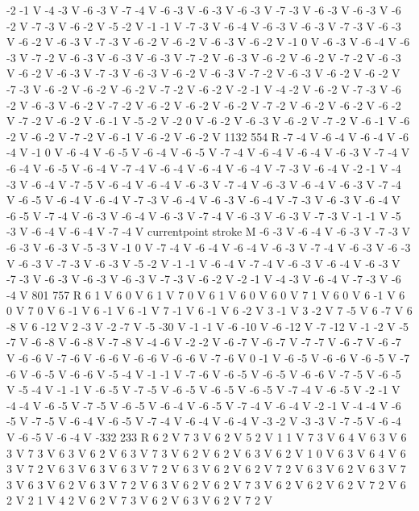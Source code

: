 {-2 -1 V
-4 -3 V
-6 -3 V
-7 -4 V
-6 -3 V
-6 -3 V
-6 -3 V
-7 -3 V
-6 -3 V
-6 -3 V
-6 -2 V
-7 -3 V
-6 -2 V
-5 -2 V
-1 -1 V
-7 -3 V
-6 -4 V
-6 -3 V
-6 -3 V
-7 -3 V
-6 -3 V
-6 -2 V
-6 -3 V
-7 -3 V
-6 -2 V
-6 -2 V
-6 -3 V
-6 -2 V
-1 0 V
-6 -3 V
-6 -4 V
-6 -3 V
-7 -2 V
-6 -3 V
-6 -3 V
-6 -3 V
-7 -2 V
-6 -3 V
-6 -2 V
-6 -2 V
-7 -2 V
-6 -3 V
-6 -2 V
-6 -3 V
-7 -3 V
-6 -3 V
-6 -2 V
-6 -3 V
-7 -2 V
-6 -3 V
-6 -2 V
-6 -2 V
-7 -3 V
-6 -2 V
-6 -2 V
-6 -2 V
-7 -2 V
-6 -2 V
-2 -1 V
-4 -2 V
-6 -2 V
-7 -3 V
-6 -2 V
-6 -3 V
-6 -2 V
-7 -2 V
-6 -2 V
-6 -2 V
-6 -2 V
-7 -2 V
-6 -2 V
-6 -2 V
-6 -2 V
-7 -2 V
-6 -2 V
-6 -1 V
-5 -2 V
-2 0 V
-6 -2 V
-6 -3 V
-6 -2 V
-7 -2 V
-6 -1 V
-6 -2 V
-6 -2 V
-7 -2 V
-6 -1 V
-6 -2 V
-6 -2 V
1132 554 R
-7 -4 V
-6 -4 V
-6 -4 V
-6 -4 V
-1 0 V
-6 -4 V
-6 -5 V
-6 -4 V
-6 -5 V
-7 -4 V
-6 -4 V
-6 -4 V
-6 -3 V
-7 -4 V
-6 -4 V
-6 -5 V
-6 -4 V
-7 -4 V
-6 -4 V
-6 -4 V
-6 -4 V
-7 -3 V
-6 -4 V
-2 -1 V
-4 -3 V
-6 -4 V
-7 -5 V
-6 -4 V
-6 -4 V
-6 -3 V
-7 -4 V
-6 -3 V
-6 -4 V
-6 -3 V
-7 -4 V
-6 -5 V
-6 -4 V
-6 -4 V
-7 -3 V
-6 -4 V
-6 -3 V
-6 -4 V
-7 -3 V
-6 -3 V
-6 -4 V
-6 -5 V
-7 -4 V
-6 -3 V
-6 -4 V
-6 -3 V
-7 -4 V
-6 -3 V
-6 -3 V
-7 -3 V
-1 -1 V
-5 -3 V
-6 -4 V
-6 -4 V
-7 -4 V
currentpoint stroke M
-6 -3 V
-6 -4 V
-6 -3 V
-7 -3 V
-6 -3 V
-6 -3 V
-5 -3 V
-1 0 V
-7 -4 V
-6 -4 V
-6 -4 V
-6 -3 V
-7 -4 V
-6 -3 V
-6 -3 V
-6 -3 V
-7 -3 V
-6 -3 V
-5 -2 V
-1 -1 V
-6 -4 V
-7 -4 V
-6 -3 V
-6 -4 V
-6 -3 V
-7 -3 V
-6 -3 V
-6 -3 V
-6 -3 V
-7 -3 V
-6 -2 V
-2 -1 V
-4 -3 V
-6 -4 V
-7 -3 V
-6 -4 V
801 757 R
6 1 V
6 0 V
6 1 V
7 0 V
6 1 V
6 0 V
6 0 V
7 1 V
6 0 V
6 -1 V
6 0 V
7 0 V
6 -1 V
6 -1 V
6 -1 V
7 -1 V
6 -1 V
6 -2 V
3 -1 V
3 -2 V
7 -5 V
6 -7 V
6 -8 V
6 -12 V
2 -3 V
-2 -7 V
-5 -30 V
-1 -1 V
-6 -10 V
-6 -12 V
-7 -12 V
-1 -2 V
-5 -7 V
-6 -8 V
-6 -8 V
-7 -8 V
-4 -6 V
-2 -2 V
-6 -7 V
-6 -7 V
-7 -7 V
-6 -7 V
-6 -7 V
-6 -6 V
-7 -6 V
-6 -6 V
-6 -6 V
-6 -6 V
-7 -6 V
0 -1 V
-6 -5 V
-6 -6 V
-6 -5 V
-7 -6 V
-6 -5 V
-6 -6 V
-5 -4 V
-1 -1 V
-7 -6 V
-6 -5 V
-6 -5 V
-6 -6 V
-7 -5 V
-6 -5 V
-5 -4 V
-1 -1 V
-6 -5 V
-7 -5 V
-6 -5 V
-6 -5 V
-6 -5 V
-7 -4 V
-6 -5 V
-2 -1 V
-4 -4 V
-6 -5 V
-7 -5 V
-6 -5 V
-6 -4 V
-6 -5 V
-7 -4 V
-6 -4 V
-2 -1 V
-4 -4 V
-6 -5 V
-7 -5 V
-6 -4 V
-6 -5 V
-7 -4 V
-6 -4 V
-6 -4 V
-3 -2 V
-3 -3 V
-7 -5 V
-6 -4 V
-6 -5 V
-6 -4 V
-332 233 R
6 2 V
7 3 V
6 2 V
5 2 V
1 1 V
7 3 V
6 4 V
6 3 V
6 3 V
7 3 V
6 3 V
6 2 V
6 3 V
7 3 V
6 2 V
6 2 V
6 3 V
6 2 V
1 0 V
6 3 V
6 4 V
6 3 V
7 2 V
6 3 V
6 3 V
6 3 V
7 2 V
6 3 V
6 2 V
6 2 V
7 2 V
6 3 V
6 2 V
6 3 V
7 3 V
6 3 V
6 2 V
6 3 V
7 2 V
6 3 V
6 2 V
6 2 V
7 3 V
6 2 V
6 2 V
6 2 V
7 2 V
6 2 V
2 1 V
4 2 V
6 2 V
7 3 V
6 2 V
6 3 V
6 2 V
7 2 V
}
